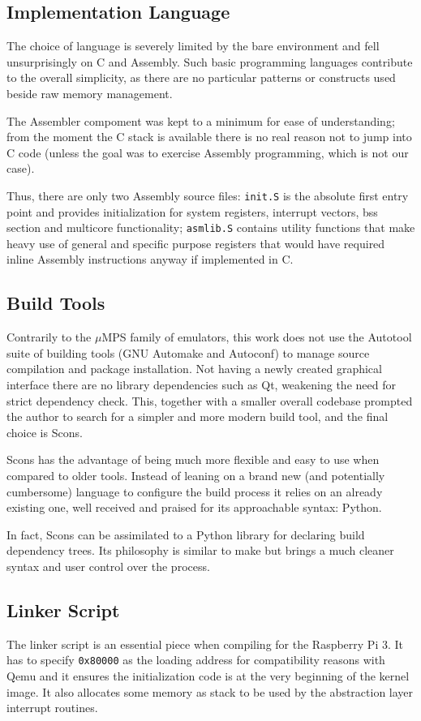 \documentclass[12pt,a4paper,openright,twoside]{report}
\begin{document}
\subsection{Implementation Language}
The choice of language is severely limited by the bare environment and fell unsurprisingly
on C and Assembly. Such basic programming languages contribute to the overall simplicity,
as there are no particular patterns or constructs used beside raw memory management.

The Assembler compoment was kept to a minimum for ease of understanding; from
the moment the C stack is available there is no real reason not to jump into 
C code (unless the goal was to exercise Assembly programming, which is not our case).

Thus, there are only two Assembly source files: {\tt init.S} is the absolute first
entry point and provides initialization for system registers, interrupt vectors, 
bss section and multicore functionality; {\tt asmlib.S} contains utility functions
that make heavy use of general and specific purpose registers that would have
required inline Assembly instructions anyway if implemented in C.

\subsection{Build Tools}
Contrarily to the $\mu$MPS family of emulators, this work does not use the 
Autotool suite of building tools (GNU Automake and Autoconf) to manage source 
compilation and package installation.
Not having a newly created graphical interface there are no library dependencies
such as Qt, weakening the need for strict dependency check. 
This, together with a smaller overall codebase prompted the author to search 
for a simpler and more modern build tool, and the final choice is Scons.

Scons has the advantage of being much more flexible and easy to use when compared
to older tools. Instead of leaning on a brand new (and potentially cumbersome)
language to configure the build process it relies on an already existing one, well
received and praised for its approachable syntax: Python.

In fact, Scons can be assimilated to a Python library for declaring build dependency
trees. Its philosophy is similar to make but brings a much cleaner syntax and 
user control over the process. 

\subsection{Linker Script}
The linker script is an essential piece when compiling for the Raspberry Pi 3. It has
to specify {\tt 0x80000} as the loading address for compatibility reasons with Qemu
and it ensures the initialization code is at the very beginning of the kernel image.
It also allocates some memory as stack to be used by the abstraction layer interrupt
routines.
\end{document}
